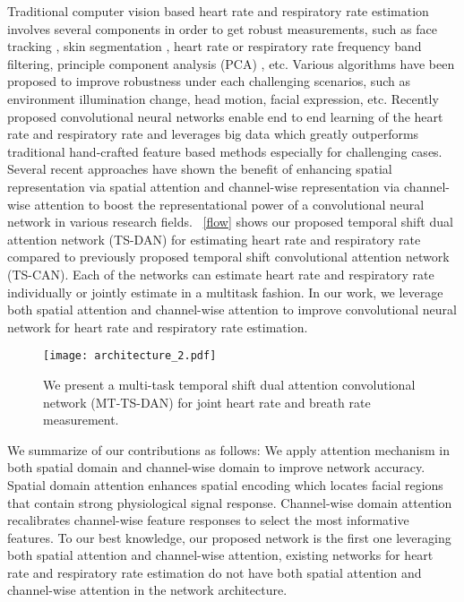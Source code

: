 \documentclass[conference]{IEEEtran}
\begin{document}
Traditional computer vision based heart rate and respiratory rate estimation involves several components in order to get robust measurements, such as face tracking \cite{wang2016algorithmic}, skin segmentation \cite{tasli2014remote}, heart rate or respiratory rate frequency band filtering\cite{wang2017robust}, principle component analysis (PCA) \cite{lewandowska2011measuring}, etc. Various algorithms have been proposed to improve robustness under each challenging scenarios, such as environment illumination change, head motion, facial expression, etc. Recently proposed convolutional neural networks enable end to end learning of the heart rate and respiratory rate and leverages big data which greatly outperforms traditional hand-crafted feature based methods especially for challenging cases. Several recent approaches have shown the benefit of enhancing spatial representation via spatial attention and channel-wise representation via channel-wise attention to boost the representational power of a convolutional neural network in various research fields. \figurename~\ref{flow} shows our proposed temporal shift dual attention network (TS-DAN) for estimating heart rate and respiratory rate compared to previously proposed temporal shift convolutional attention network (TS-CAN). Each of the networks can estimate heart rate and respiratory rate individually or jointly estimate in a multitask fashion. In our work, we leverage both spatial attention and channel-wise attention to improve convolutional neural network for heart rate and respiratory rate estimation.


\begin{figure*}[ht]
\centering
\texttt{[image: architecture\_2.pdf]}
\caption{We present a multi-task temporal shift dual attention convolutional network (MT-TS-DAN) for joint heart rate and breath rate measurement.}
\label{architecture}
\end{figure*}

We summarize of our contributions as follows: We apply attention mechanism in both spatial domain and channel-wise domain to improve network accuracy. Spatial domain attention enhances spatial encoding which locates facial regions that contain strong physiological signal response. Channel-wise domain attention recalibrates channel-wise feature responses to select the most informative features. To our best knowledge, our proposed network is the first one leveraging both spatial attention and channel-wise attention, existing networks for heart rate and respiratory rate estimation do not have both spatial attention and channel-wise attention in the network architecture.
\end{document}
